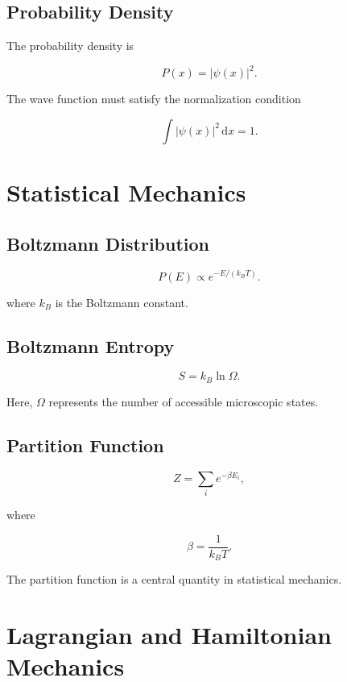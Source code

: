 \documentclass[11pt,a4paper]{article}
\newcommand{\dd}{\mathrm{d}}
\begin{document}
\subsection{Probability Density}

The probability density is

\[
P(x)=|\psi(x)|^2.
\]

The wave function must satisfy the normalization condition

\[
\int |\psi(x)|^2\,\dd x=1.
\]

\section{Statistical Mechanics}

\subsection{Boltzmann Distribution}

\[
P(E)\propto e^{-E/(k_BT)}.
\]

where $k_B$ is the Boltzmann constant.

\subsection{Boltzmann Entropy}

\[
S=k_B\ln\Omega.
\]

Here, $\Omega$ represents the number of accessible microscopic states.

\subsection{Partition Function}

\[
Z=\sum_i e^{-\beta E_i},
\]

where

\[
\beta=\frac{1}{k_BT}.
\]

The partition function is a central quantity in statistical mechanics.

\section{Lagrangian and Hamiltonian Mechanics}
\end{document}

